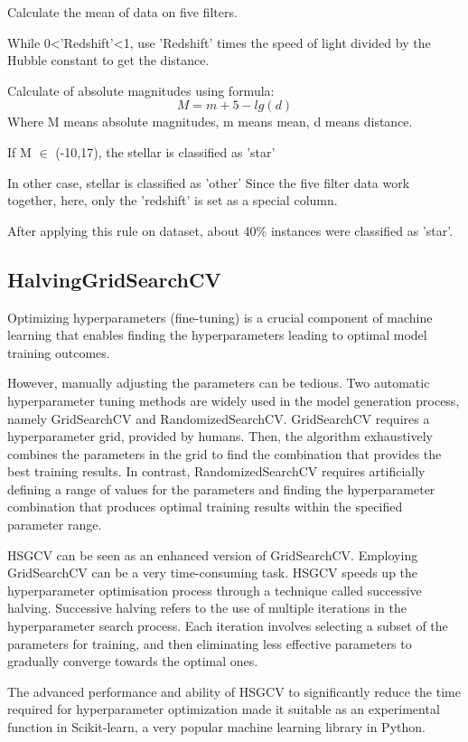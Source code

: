 \documentclass[runningheads,a4paper]{llncs}
\begin{document}
Calculate the mean of data on five filters.

While  0\textless'Redshift'\textless1, use 'Redshift' times the speed of light divided by the Hubble constant to get the distance.

Calculate of absolute magnitudes using formula:
\begin{equation}
M = m + 5 - lg(d)
\end{equation}
Where M means absolute magnitudes, m means mean, d means distance.

If M $\in$ (-10,17), the stellar is classified as 'star'

In other case, stellar is classified as 'other'
Since the five filter data work together, here, only the 'redshift' is set as a special column.

After applying this rule on dataset, about 40\% instances were classified as 'star'.
\subsection{HalvingGridSearchCV}
Optimizing hyperparameters (fine-tuning) is a crucial component of machine learning that enables finding the hyperparameters leading to optimal model training outcomes.

However, manually adjusting the parameters can be tedious.
Two automatic hyperparameter tuning methods are widely used in the model generation process, namely GridSearchCV and RandomizedSearchCV. GridSearchCV requires a hyperparameter grid, provided by humans. Then, the algorithm exhaustively combines the parameters in the grid to find the combination that provides the best training results.
In contrast, RandomizedSearchCV requires artificially defining a range of values for the parameters and finding the hyperparameter combination that produces optimal training results within the specified parameter range.

HSGCV can be seen as an enhanced version of GridSearchCV. Employing GridSearchCV can be a very time-consuming task. HSGCV speeds up the hyperparameter optimisation process through a technique called successive halving\cite{pmlr-v51-jamieson16}.
Successive halving refers to the use of multiple iterations in the hyperparameter search process. Each iteration involves selecting a subset of the parameters for training, and then eliminating less effective parameters to gradually converge towards the optimal ones.

The advanced performance and ability of HSGCV to significantly reduce the time required for hyperparameter optimization made it suitable as an experimental function in Scikit-learn\cite{pedregosa2011scikit}, a very popular machine learning library in Python.
\end{document}

